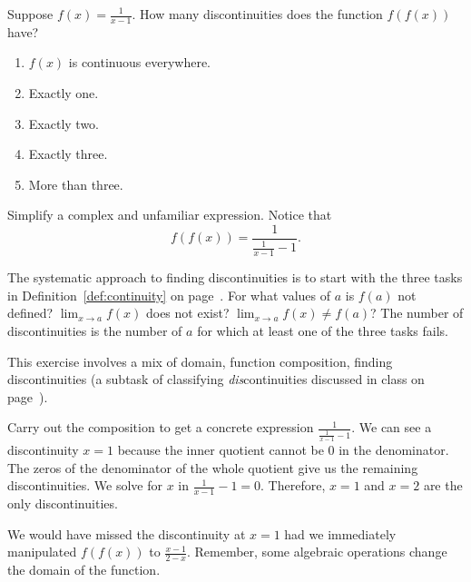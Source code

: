 \documentclass[../main.tex]{subfiles}
\begin{document}
\begin{exercise} \label{ex:midterm-exercise-4}
  Suppose \(f(x) = \frac{1}{x - 1}\). How many discontinuities does the function \(f(f(x))\) have?
  \begin{enumerate}[label=\Alph*.]
    \item \(f(x)\) is continuous everywhere.
    \item Exactly one.
    \item Exactly two.
    \item Exactly three.
    \item More than three.
  \end{enumerate}

  \begin{hint}
    Simplify a complex and unfamiliar expression. Notice that
    \[
      f(f(x)) = \frac{1}{\frac{1}{x-1} - 1}.
    \]

    The systematic approach to finding discontinuities is to start with the three tasks in Definition~\ref{def:continuity} on page~\pageref{def:continuity}. For what values of \(a\) is \(f(a)\) not defined? \(\lim_{x \to a} f(x)\) does not exist? \(\lim_{x \to a} f(x) \ne f(a)\)?  The number of discontinuities is the number of \(a\) for which at least one of the three tasks fails.
  \end{hint}
  \begin{solution}
    This exercise involves a mix of domain, function composition, finding discontinuities (a subtask of classifying \emph{dis}continuities discussed in class on page~\pageref{technique:classify-discontinuities}).

    Carry out the composition to get a concrete expression \(\frac{1}{\frac{1}{x-1} - 1}\). We can see a discontinuity \(x = 1\) because the inner quotient cannot be \(0\) in the denominator.  The zeros of the denominator of the whole quotient give us the remaining discontinuities.  We solve for \(x\) in \(\frac{1}{x - 1} - 1 = 0\). Therefore, \(x = 1\) and \(x = 2\) are the only discontinuities.

    We would have missed the discontinuity at \(x = 1\) had we immediately manipulated \(f(f(x))\) to \(\frac{x-1}{2-x}\).  Remember, some algebraic operations change the domain of the function.
  \end{solution}
\end{exercise}
\nopagebreak\vfill
\end{document}

